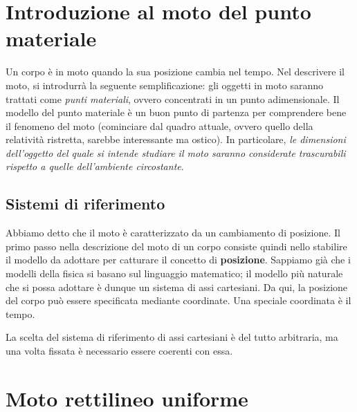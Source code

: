 


\section{Introduzione al moto del punto materiale}
Un corpo è in moto quando la sua posizione cambia nel tempo. Nel descrivere il
moto, si introdurrà la seguente semplificazione: gli oggetti in moto saranno
trattati come \textit{punti materiali}, ovvero concentrati in un punto
adimensionale. Il modello del punto materiale è un buon punto di partenza per
comprendere bene il fenomeno del moto (cominciare dal quadro attuale, ovvero
quello della relatività ristretta, sarebbe interessante ma ostico). In particolare,
\textit{le dimensioni dell'oggetto del quale si intende studiare il moto saranno
considerate trascurabili rispetto a quelle dell'ambiente circostante}.

\subsection{Sistemi di riferimento}
Abbiamo detto che il moto è caratterizzato da un cambiamento di posizione. Il primo
passo nella descrizione del moto di un corpo consiste quindi nello stabilire il
modello da adottare per catturare il concetto di \textbf{posizione}. Sappiamo già
che i modelli della fisica si basano sul linguaggio matematico; il modello più
naturale che si possa adottare è dunque un sistema di assi cartesiani. Da qui, la
posizione del corpo può essere specificata mediante coordinate. Una speciale
coordinata è il tempo.

La scelta del sistema di riferimento di assi cartesiani è del tutto arbitraria,
ma una volta fissata è necessario essere coerenti con essa.


\section{Moto rettilineo uniforme}

